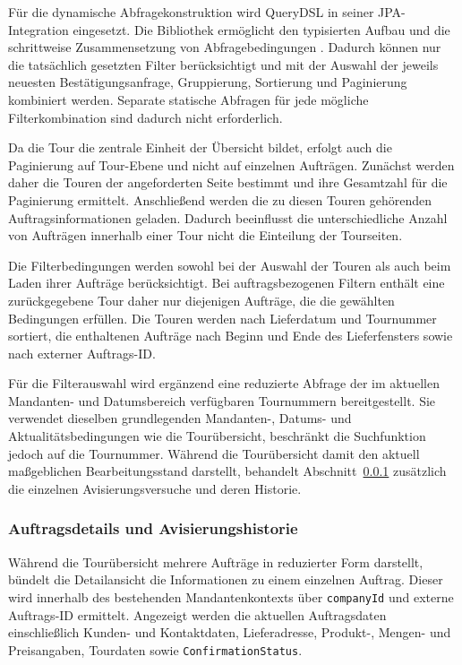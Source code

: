 \documentclass[
  12pt,
  a4paper,
  oneside
]{article}
\begin{document}
Für die dynamische Abfragekonstruktion wird QueryDSL in seiner JPA-Integration
eingesetzt. Die Bibliothek ermöglicht den typisierten Aufbau und die
schrittweise Zusammensetzung von Abfragebedingungen
\parencite{querydslUnifiedQueries}. Dadurch können nur die tatsächlich gesetzten
Filter berücksichtigt und mit der Auswahl der jeweils neuesten
Bestätigungsanfrage, Gruppierung, Sortierung und Paginierung kombiniert
werden. Separate statische Abfragen für jede mögliche Filterkombination sind
dadurch nicht erforderlich.

Da die Tour die zentrale Einheit der Übersicht bildet, erfolgt auch die
Paginierung auf Tour-Ebene und nicht auf einzelnen Aufträgen. Zunächst werden
daher die Touren der angeforderten Seite bestimmt und ihre Gesamtzahl für die
Paginierung ermittelt. Anschließend werden die zu diesen Touren gehörenden
Auftragsinformationen geladen. Dadurch beeinflusst die unterschiedliche Anzahl
von Aufträgen innerhalb einer Tour nicht die Einteilung der Tourseiten.

Die Filterbedingungen werden sowohl bei der Auswahl der Touren als auch beim
Laden ihrer Aufträge berücksichtigt. Bei auftragsbezogenen Filtern enthält eine
zurückgegebene Tour daher nur diejenigen Aufträge, die die gewählten
Bedingungen erfüllen. Die Touren werden nach Lieferdatum und Tournummer
sortiert, die enthaltenen Aufträge nach Beginn und Ende des Lieferfensters
sowie nach externer Auftrags-ID.

Für die Filterauswahl wird ergänzend eine reduzierte Abfrage der im aktuellen
Mandanten- und Datumsbereich verfügbaren Tournummern bereitgestellt. Sie
verwendet dieselben grundlegenden Mandanten-, Datums- und
Aktualitätsbedingungen wie die Tourübersicht, beschränkt die Suchfunktion
jedoch auf die Tournummer. Während die Tourübersicht damit den aktuell
maßgeblichen Bearbeitungsstand darstellt, behandelt
Abschnitt~\ref{sec:auftragsdetails-avisierungshistorie} zusätzlich die
einzelnen Avisierungsversuche und deren Historie.

\subsubsection{Auftragsdetails und Avisierungshistorie}
\label{sec:auftragsdetails-avisierungshistorie}

Während die Tourübersicht mehrere Aufträge in reduzierter Form darstellt,
bündelt die Detailansicht die Informationen zu einem einzelnen Auftrag. Dieser
wird innerhalb des bestehenden Mandantenkontexts über \texttt{companyId} und
externe Auftrags-ID ermittelt. Angezeigt werden die aktuellen Auftragsdaten
einschließlich Kunden- und Kontaktdaten, Lieferadresse, Produkt-, Mengen- und
Preisangaben, Tourdaten sowie \texttt{ConfirmationStatus}.
\end{document}
